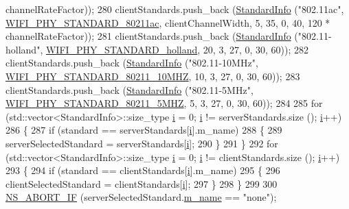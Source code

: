 \begin{DoxyCode}
      channelRateFactor));
280   clientStandards.push\_back (\hyperlink{structStandardInfo}{StandardInfo} (\textcolor{stringliteral}{"802.11ac"}, 
      \hyperlink{group__wifi_gga1299834f4e1c615af3ca738033b76a49a7c078959de635b84fb280a955dcfb27e}{WIFI\_PHY\_STANDARD\_80211ac}, clientChannelWidth, 5, 35, 0, 40, 120 * 
      channelRateFactor));
281   clientStandards.push\_back (\hyperlink{structStandardInfo}{StandardInfo} (\textcolor{stringliteral}{"802.11-holland"}, 
      \hyperlink{group__wifi_gga1299834f4e1c615af3ca738033b76a49aca926d77ddca0fc6d8cdcb190b2e520e}{WIFI\_PHY\_STANDARD\_holland}, 20, 3, 27, 0, 30, 60));
282   clientStandards.push\_back (\hyperlink{structStandardInfo}{StandardInfo} (\textcolor{stringliteral}{"802.11-10MHz"}, 
      \hyperlink{group__wifi_gga1299834f4e1c615af3ca738033b76a49aff863c98db467eb76170dc8bbe743de7}{WIFI\_PHY\_STANDARD\_80211\_10MHZ}, 10, 3, 27, 0, 30, 60));
283   clientStandards.push\_back (\hyperlink{structStandardInfo}{StandardInfo} (\textcolor{stringliteral}{"802.11-5MHz"}, 
      \hyperlink{group__wifi_gga1299834f4e1c615af3ca738033b76a49a8311083bdd8ae58e73ab6e81a53fd7be}{WIFI\_PHY\_STANDARD\_80211\_5MHZ}, 5, 3, 27, 0, 30, 60));
284 
285   \textcolor{keywordflow}{for} (std::vector<StandardInfo>::size\_type \hyperlink{bernuolliDistribution_8m_a6f6ccfcf58b31cb6412107d9d5281426}{i} = 0; \hyperlink{bernuolliDistribution_8m_a6f6ccfcf58b31cb6412107d9d5281426}{i} != serverStandards.size (); 
      \hyperlink{bernuolliDistribution_8m_a6f6ccfcf58b31cb6412107d9d5281426}{i}++)
286     \{
287       \textcolor{keywordflow}{if} (standard == serverStandards[\hyperlink{bernuolliDistribution_8m_a6f6ccfcf58b31cb6412107d9d5281426}{i}].m\_name)
288         \{
289           serverSelectedStandard = serverStandards[\hyperlink{bernuolliDistribution_8m_a6f6ccfcf58b31cb6412107d9d5281426}{i}];
290         \}
291     \}
292   \textcolor{keywordflow}{for} (std::vector<StandardInfo>::size\_type \hyperlink{bernuolliDistribution_8m_a6f6ccfcf58b31cb6412107d9d5281426}{i} = 0; \hyperlink{bernuolliDistribution_8m_a6f6ccfcf58b31cb6412107d9d5281426}{i} != clientStandards.size (); 
      \hyperlink{bernuolliDistribution_8m_a6f6ccfcf58b31cb6412107d9d5281426}{i}++)
293     \{
294       \textcolor{keywordflow}{if} (standard == clientStandards[\hyperlink{bernuolliDistribution_8m_a6f6ccfcf58b31cb6412107d9d5281426}{i}].m\_name)
295         \{
296           clientSelectedStandard = clientStandards[\hyperlink{bernuolliDistribution_8m_a6f6ccfcf58b31cb6412107d9d5281426}{i}];
297         \}
298     \}
299 
300   \hyperlink{group__fatal_ga979468222aa80366c2c98aa1554f3eec}{NS\_ABORT\_IF} (serverSelectedStandard.\hyperlink{structStandardInfo_a101f61fce329acf44c178f191d89bc2b}{m\_name} == \textcolor{stringliteral}{"none"});

\end{DoxyCode}
